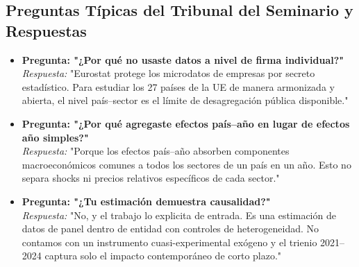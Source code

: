 \documentclass[12pt,a4paper]{article}
\begin{document}
\subsection{Preguntas Típicas del Tribunal del Seminario y Respuestas}
\begin{itemize}[leftmargin=*]
  \item \textbf{Pregunta: "¿Por qué no usaste datos a nivel de firma individual?"} \\
  \textit{Respuesta:} "Eurostat protege los microdatos de empresas por secreto estadístico. Para estudiar los 27 países de la UE de manera armonizada y abierta, el nivel país--sector es el límite de desagregación pública disponible."
  \item \textbf{Pregunta: "¿Por qué agregaste efectos país--año en lugar de efectos año simples?"} \\
  \textit{Respuesta:} "Porque los efectos país--año absorben componentes macroeconómicos comunes a todos los sectores de un país en un año. Esto no separa shocks ni precios relativos específicos de cada sector."
  \item \textbf{Pregunta: "¿Tu estimación demuestra causalidad?"} \\
  \textit{Respuesta:} "No, y el trabajo lo explicita de entrada. Es una estimación de datos de panel dentro de entidad con controles de heterogeneidad. No contamos con un instrumento cuasi-experimental exógeno y el trienio 2021--2024 captura solo el impacto contemporáneo de corto plazo."
\end{itemize}

\vspace{0.5cm}
\small


\end{document}
